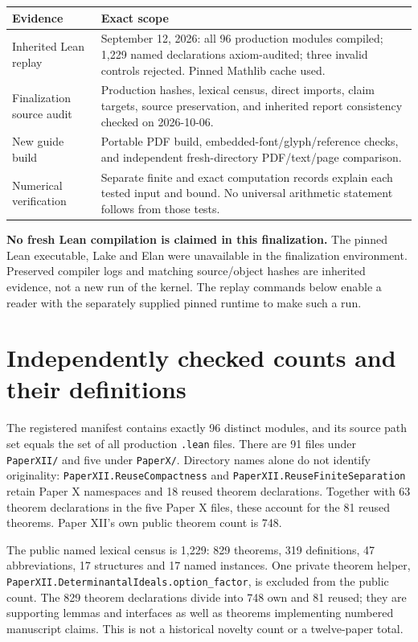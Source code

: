 \documentclass[11pt]{article}
\newcommand{\code}[1]{\nolinkurl{#1}}
\newcommand{\module}[1]{\nolinkurl{PaperXII.#1}}
\begin{document}
\begin{center}
\begin{tabular}{p{}p{}}
\toprule Evidence & Exact scope\\\midrule
Inherited Lean replay & September 12, 2026: all 96 production modules compiled; 1,229 named declarations axiom-audited; three invalid controls rejected. Pinned Mathlib cache used.\\
Finalization source audit & Production hashes, lexical census, direct imports, claim targets, source preservation, and inherited report consistency checked on 2026-10-06.\\
New guide build & Portable PDF build, embedded-font/glyph/reference checks, and independent fresh-directory PDF/text/page comparison.\\
Numerical verification & Separate finite and exact computation records explain each tested input and bound. No universal arithmetic statement follows from those tests.\\
\bottomrule
\end{tabular}
\end{center}

\textbf{No fresh Lean compilation is claimed in this finalization.} The pinned Lean executable, Lake and Elan were unavailable in the finalization environment. Preserved compiler logs and matching source/object hashes are inherited evidence, not a new run of the kernel. The replay commands below enable a reader with the separately supplied pinned runtime to make such a run.

\section{Independently checked counts and their definitions}
The registered manifest contains exactly 96 distinct modules, and its source path set equals the set of all production \code{.lean} files. There are 91 files under \code{PaperXII/} and five under \code{PaperX/}. Directory names alone do not identify originality: \module{ReuseCompactness} and \module{ReuseFiniteSeparation} retain Paper X namespaces and 18 reused theorem declarations. Together with 63 theorem declarations in the five Paper X files, these account for the 81 reused theorems. Paper XII's own public theorem count is 748.

The public named lexical census is 1,229: 829 theorems, 319 definitions, 47 abbreviations, 17 structures and 17 named instances. One private theorem helper, \code{PaperXII.DeterminantalIdeals.option_factor}, is excluded from the public count. The 829 theorem declarations divide into 748 own and 81 reused; they are supporting lemmas and interfaces as well as theorems implementing numbered manuscript claims. This is not a historical novelty count or a twelve-paper total.
\end{document}
